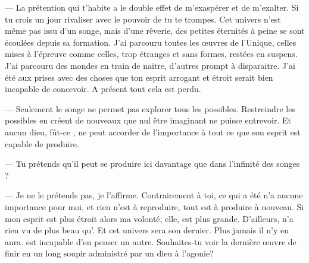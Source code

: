 --- La prétention qui t'habite a le double effet de m'exaspérer et de m'exalter. Si tu crois un jour rivaliser avec le pouvoir de \Mey tu te trompes. Cet univers n'est même pas issu d'un songe, mais d'une rêverie, des petites éternités à peine se sont écoulées depuis sa formation. J'ai parcouru toutes les œuvres de l'Unique, celles mises à l'épreuve comme celles, trop étranges et sans formes, restées en suspens. J'ai parcouru des mondes en train de naitre, d'autres prompt à disparaitre. J'ai été aux prises avec des choses que ton esprit arrogant et étroit serait bien incapable de concevoir. A présent tout cela est perdu.

--- Seulement le songe ne permet pas explorer tous les possibles. Restreindre les possibles en créent de nouveaux que nul être imaginant ne puisse entrevoir. Et aucun dieu, fût-ce \Mey, ne peut accorder de l'importance à tout ce que son esprit est capable de produire.

--- Tu prétends qu'il peut se produire ici davantage que dans l'infinité des songes ? 

--- Je ne le prétends pas, je l'affirme. Contrairement à toi, ce qui a été n'a aucune importance pour moi, et rien n'est à reproduire, tout est à produire à nouveau. Si mon esprit est plus étroit alors ma volonté, elle, est plus grande. D'ailleurs, \Mey n'a rien vu de plus beau qu'\Auga. Et cet univers sera son dernier. Plus jamais il n'y en aura. \Cind est incapable d'en penser un autre. Souhaites-tu voir la dernière œuvre de \Mey finir en un long soupir administré par un dieu à l'agonie?

